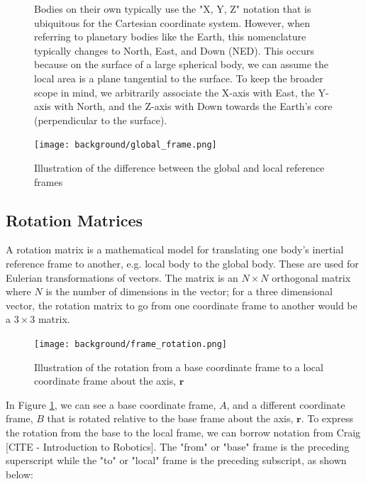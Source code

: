 \begin{figure}
    \begin{fitbox}[frametitle=Aside: Notation and Nomenclature for Rotations]
        Bodies on their own typically use the "X, Y, Z" notation that is ubiquitous for the Cartesian coordinate system.
        However, when referring to planetary bodies like the Earth, this nomenclature typically changes to North, East, and Down (NED).
        This occurs because on the surface of a large spherical body, we can assume the local area is a plane tangential to the surface.
        To keep the broader scope in mind, we arbitrarily associate the X-axis with East, the Y-axis with North, and the Z-axis with Down towards the Earth's core (perpendicular to the surface).

        \caption{Illustration of the difference between the global and local reference frames}
        \centering
        \texttt{[image: background/global\_frame.png]}
    \end{fitbox}
\end{figure}

\subsection{Rotation Matrices}
A rotation matrix is a mathematical model for translating one body's inertial reference frame to another, e.g. local body to the global body.
These are used for Eulerian transformations of vectors.
The matrix is an $N \times N$ orthogonal matrix where $N$ is the number of dimensions in the vector;
for a three dimensional vector, the rotation matrix to go from one coordinate frame to another would be a $3 \times 3$ matrix.

\begin{figure}[h!]
    \caption{Illustration of the rotation from a base coordinate frame to a local coordinate frame about the axis, $\pmb{r}$}
    \label{fig:frame_rotation}
    \centering
    \texttt{[image: background/frame\_rotation.png]}
\end{figure}

In Figure \ref{fig:frame_rotation}, we can see a base coordinate frame, $A$, and a different coordinate frame, $B$ that is rotated relative to the base frame about the axis, $\pmb{r}$.
To express the rotation from the base to the local frame, we can borrow notation from Craig [CITE - Introduction to Robotics].
The "from" or "base" frame is the preceding superscript while the "to" or "local" frame is the preceding subscript, as shown below:

